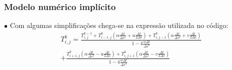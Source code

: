 \documentclass[xcolor=dvipsnames,10pt,aspectratio=169]{beamer}
\begin{document}
	\begin{frame}
		\frametitle{Modelo numérico implícito}
		$\bullet$ Com algumas simplificações chega-se na expressão utilizada no código:
		\begin{equation}
			\begin{split}
			T_{i,j}^{k} = \frac{T_{i,j}^{k-1} + T_{i -1, j}^{k} \left( \alpha \frac{\Delta t}{\Delta s^2} + u \frac{\Delta t}{2 \Delta s} \right) 	+ T_{i,j-1}^{k} \left( \alpha \frac{\Delta t}{\Delta s^2} + v \frac{\Delta t}{2 \Delta s} \right)}{ 1 - 4 \frac{\alpha \Delta t}{\Delta s ^2}} \\
			+ \frac{  T_{i+1,j}^{k} \left( \alpha \frac{\Delta t}{ \Delta s^2} - u \frac{\Delta t}{2 \Delta s}\right)
			+  T_{i,j+1}^{k} \left( \alpha \frac{\Delta t}{\Delta s^2} - v \frac{\Delta t}{2 \Delta s}\right)}{ 1 - 4 \frac{\alpha \Delta t}{\Delta s ^2}}
			\end{split}
		\end{equation}
	\end{frame}
\end{document}
